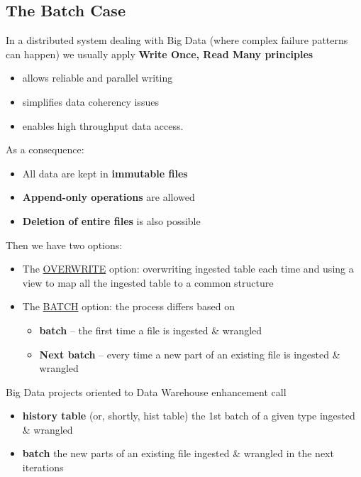 \documentclass[10pt,a4paper]{article}
\begin{document}
\subsection{The Batch Case}
In a distributed system dealing with Big Data (where complex failure patterns can happen) we usually apply \textbf{Write Once, Read Many principles}
\begin{itemize}
	\item allows reliable and parallel writing
	\item simplifies data coherency issues
	\item enables high throughput data access.
\end{itemize}
As a consequence:
\begin{itemize}
	\item All data are kept in \textbf{immutable files}
	\item \textbf{Append-only operations} are allowed
	\item \textbf{Deletion of entire files} is also possible
\end{itemize}
Then we have two options:
\begin{itemize}
	\item The \uline{OVERWRITE} option: overwriting ingested table each time and using a view to map all the ingested table to a common structure
	\item The \uline{BATCH} option: the process differs based on
	\begin{itemize}
		\item {} \textbf{batch} – the first time a file is ingested \& wrangled
		\item \textbf{Next batch} – every time a new part of an existing file is ingested \& wrangled
	\end{itemize}
\end{itemize}
Big Data projects oriented to Data Warehouse enhancement call
\begin{itemize}
	\item \textbf{history table} (or, shortly, hist table) the 1st batch of a given type ingested \&
wrangled
	\item \textbf{batch} the new parts of an existing file ingested \& wrangled in the next iterations
\end{itemize}
\end{document}

